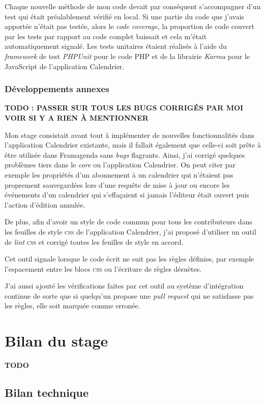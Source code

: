 \documentclass[10pt,a4paper, twoside]{report}
\newcommand{\mychapter}[2]{
	\setcounter{chapter}{#1}
	\setcounter{section}{0}
	\chapter*{#2}
	\addcontentsline{toc}{chapter}{#2}
}
\begin{document}
	Chaque nouvelle méthode de mon code devait par conséquent s'accompagner d'un test qui était préalablement vérifié en local. Si une partie du code que j'avais apportée n'était pas testée, alors le \textit{code coverage}, la proportion de code couvert par les tests par rapport au code complet baissait et cela m'était automatiquement signalé. Les tests unitaires étaient réalisés à l'aide du \textit{framework} de test \textit{PHPUnit} pour le code PHP et de la librairie \textit{Karma} pour le JavaScript de l'application Calendrier.
	
	\subsection{Développements annexes}
	
	\textbf{\color{red}TODO : PASSER SUR TOUS LES BUGS CORRIGÉS PAR MOI VOIR SI Y A RIEN À MENTIONNER}
	
	Mon stage consistait avant tout à implémenter de nouvelles fonctionnalités dans l'application Calendrier existante, mais il fallait également que celle-ci soit prête à être utilisée dans Framagenda sans \textit{bugs} flagrants. Ainsi, j'ai corrigé quelques problèmes tiers dans le \textit{core} ou l'application Calendrier.
	On peut citer par exemple les propriétés d'un abonnement à un calendrier qui n'étaient pas proprement sauvegardées lors d'une requête de mise à jour ou encore les événements d'un calendrier qui s'effaçaient si jamais l'éditeur était ouvert puis l'action d'édition annulée.
	
	De plus, afin d'avoir un style de code commun pour tous les contributeurs dans les feuilles de style \textsc{css} de l'application Calendrier, j'ai proposé d'utiliser un outil de \textit{lint} \textsc{css} et corrigé toutes les feuilles de style en accord. 
	
	Cet outil signale lorsque le code écrit ne suit pas les règles définies, par exemple l'espacement entre les blocs \textsc{css} ou l'écriture de règles désuètes.
	
	J'ai aussi ajouté les vérifications faites par cet outil au système d'intégration continue de sorte que si quelqu'un propose une \textit{pull request} qui ne satisfasse pas les règles, elle soit marquée comme erronée.
	
	\mychapter{5}{Bilan du stage}
	\textbf{\color{red}TODO}
	\section{Bilan technique}
\end{document}

